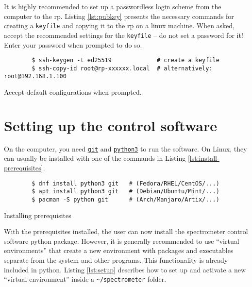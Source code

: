 It is highly recommended to set up a passwordless login scheme from the computer to the \acrshort{rp}. Listing \ref{lst:pubkey} presents the necessary commands for creating a \lstinline{keyfile} and copying it to the \acrshort{rp} on a \acrshort{linux} machine. When asked, accept the recommended settings for the \lstinline{keyfile} -- do not set a password for it! Enter your password when prompted to do so.

\begin{listing}[h!bt]
    \begin{verbatim}
        $ ssh-keygen -t ed25519             # create a keyfile
        $ ssh-copy-id root@rp-xxxxxx.local  # alternatively: root@192.168.1.100
    \end{verbatim}
    \caption{ Accept default configurations when prompted.}
    \label{lst:pubkey}
\end{listing}

\section{Setting up the control software}
On the computer, you need \href{https://git-scm.com/}{\lstinline{git}} and \href{https://www.python.org/}{\lstinline{python3}} to run the software. On Linux, they can usually be installed with one of the commands in Listing \ref{lst:install-prerequisites}.

\begin{listing}[h!bt]
    \begin{verbatim}
        $ dnf install python3 git   # (Fedora/RHEL/CentOS/...)
        $ apt install python3 git   # (Debian/Ubuntu/Mint/...)
        $ pacman -S python git      # (Arch/Manjaro/Artix/...)
    \end{verbatim}
    \caption{Installing prerequisites}
    \label{lst:install-prerequisites}
\end{listing}

With the prerequisites installed, the user can now install the spectrometer control software \gls{python} package. However, it is generally recommended to use \enquote{virtual environments} that create a new environment with packages and executables separate from the system and other programs. This functionality is already included in \gls{python}. Listing \ref{lst:setup} describes how to set up and activate a new \enquote{virtual environment} inside a \lstinline{~/spectrometer} folder.

